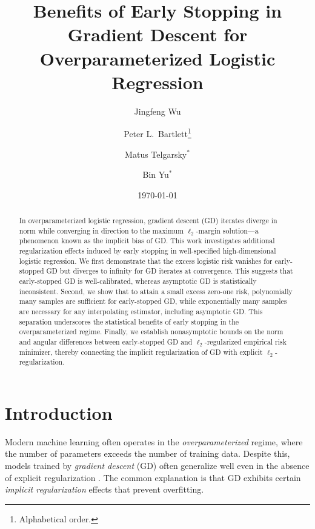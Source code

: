 \documentclass[11pt]{article}
\title{Benefits of Early Stopping in Gradient Descent for Overparameterized Logistic Regression}
\author[1]{Jingfeng Wu}
\author[1,3]{Peter L.\ Bartlett\thanks{Alphabetical order.}}
\author[2]{Matus Telgarsky$^*$}
\author[1]{Bin Yu$^*$}
\affil[1]{University of California, Berkeley\\ {\tt \{uuujf,peter,binyu\}@berkeley.edu}}
\affil[2]{New York University\\ {\tt mjt10041@nyu.edu}}
\affil[3]{Google DeepMind}
\date{\today}
\begin{document}
\maketitle

\begin{abstract}
In overparameterized logistic regression, gradient descent (GD) iterates diverge in norm while converging in direction to the maximum $\ell_2$-margin solution---a phenomenon known as the implicit bias of GD. This work investigates additional regularization effects induced by early stopping in well-specified high-dimensional logistic regression. We first demonstrate that the excess logistic risk vanishes for early-stopped GD but diverges to infinity for GD iterates at convergence. This suggests that early-stopped GD is well-calibrated, whereas asymptotic GD is statistically inconsistent. Second, we show that to attain a small excess zero-one risk, polynomially many samples are sufficient for early-stopped GD, while exponentially many samples are necessary for any interpolating estimator, including asymptotic GD. This separation underscores the statistical benefits of early stopping in the overparameterized regime. Finally, we establish nonasymptotic bounds on the norm and angular differences between early-stopped GD and $\ell_2$-regularized empirical risk minimizer, thereby connecting the implicit regularization of GD with explicit $\ell_2$-regularization.  
\end{abstract}


\section{Introduction}

Modern machine learning often operates in the \emph{overparameterized} regime, where the number of parameters exceeds the number of training data. Despite this, models trained by \emph{gradient descent} (GD) often generalize well even in the absence of explicit regularization \citep{zhang2021understanding,neyshabur2017exploring,bartlett2021deep}. The common explanation is that GD exhibits certain \emph{implicit regularization} effects that prevent overfitting. 
\end{document}
